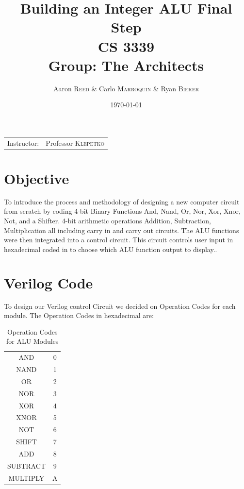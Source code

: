 \documentclass[
	letterpaper, %
	10pt, %
]{CSUniSchoolLabReport}
\title{Building an Integer ALU Final Step\\ CS 3339 \\ Group: The Architects} %
\author{Aaron \textsc{Reed} \& Carlo \textsc{Marroquin} \& Ryan \textsc{Bieker}} %
\date{\today} %
\begin{document}
\maketitle %

\begin{center}
	\begin{tabular}{l r}
		Instructor: & Professor \textsc{Klepetko} %
	\end{tabular}
\end{center}


\section{Objective}

To introduce the process and methodology of designing a new computer circuit from scratch by coding 4-bit Binary Functions And, Nand, Or, Nor, Xor, Xnor, Not, and a Shifter. 4-bit arithmetic operations Addition, Subtraction, Multiplication all including carry in and carry out circuits. The ALU functions were then integrated into a control circuit. This circuit controls user input in hexadecimal coded in to choose which ALU function output to display..

\section{Verilog Code}
To design our Verilog control Circuit we decided on Operation Codes for each module. The Operation Codes in hexadecimal are: 

\begin{table}[H]
    \centering
    \begin{tabular}{c|c}
       AND  & 0 \\
       NAND  & 1 \\
       OR & 2 \\
       NOR & 3 \\
       XOR & 4 \\
       XNOR & 5 \\
       NOT & 6 \\
       SHIFT & 7 \\
       ADD & 8 \\
       SUBTRACT & 9 \\
       MULTIPLY & A 
    \end{tabular}
    \caption{Operation Codes for ALU Modules}
    \label{tab:my_label}
\end{table}
\end{document}
